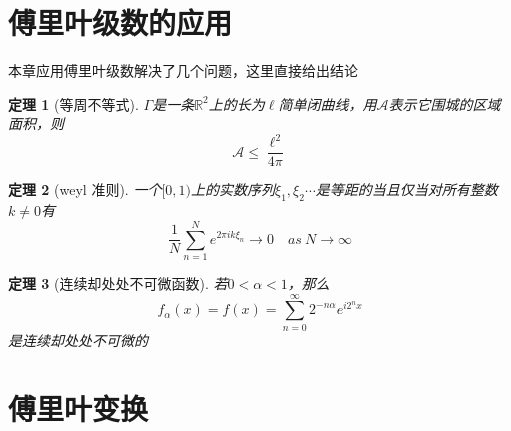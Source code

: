 \documentclass[UTF8]{ctexart}
\newtheorem{thr}{定理}
\begin{document}
\section{傅里叶级数的应用}
本章应用傅里叶级数解决了几个问题，这里直接给出结论
\begin{thr}[等周不等式]
$\Gamma$是一条$\mathbb{R}^2$上的长为$\ell$简单闭曲线，用$\mathcal{A}$表示它围城的区域面积，则$$\mathcal{A} \leq \frac{\ell^2}{4\pi}$$
\end{thr}
\begin{thr}[weyl 准则]
一个$[0,1)$上的实数序列$\xi_1,\xi_2\cdots$是等距的当且仅当对所有整数$k \neq 0 $有$$\frac{1}{N}\sum_{n=1}^{N}e^{2\pi i k \xi_n} \rightarrow 0 \quad as \ N\rightarrow \infty$$
\end{thr}
\begin{thr}[连续却处处不可微函数]
若$0<\alpha<1$，那么$$f_{\alpha}(x) = f(x) = \sum_{n=0}^{\infty}2^{-n\alpha}e^{i2^nx}$$是连续却处处不可微的
\end{thr}
\section{傅里叶变换}
\end{document}
